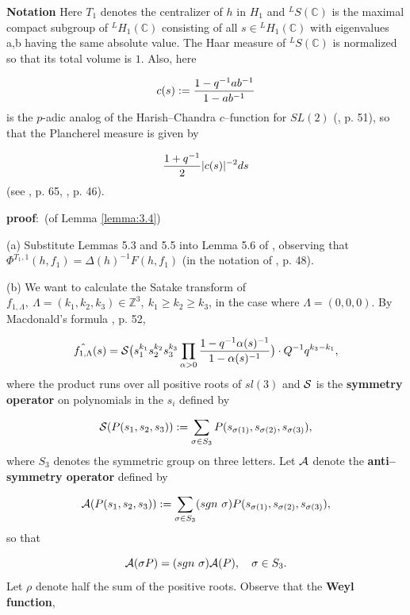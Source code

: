 \documentclass[12pt,letterpaper]{article}
\def\sss{{\cal S}}
\def\ccc{\mathbb{C}}
\def\zzz{\mathbb{Z}}
\def\pf{{\bf proof}:\ }
\begin{document}
{\bf Notation}
Here $T_1$ denotes the centralizer of $h$ in $H_1$ and
$^{L}S(\ccc )$ is the maximal compact subgroup of $^{L}H_1(\ccc )$
consisting of all $s\in {^{L}H_1}(\ccc )$ with eigenvalues a,b having the
same absolute value. The Haar measure of $^{L}S(\ccc )$ is normalized so 
that its total volume is $1$. Also, here

\[
c(s) := {1-q^{-1}ab^{-1}\over{1-ab^{-1}}}
\]
is the $p$-adic analog of the Harish--Chandra $c$--function for $SL(2)$
(\cite{M}, p. 51), so that the Plancherel measure is given by

\[
{1+q^{-1}\over{2}}|c(s)|^{-2}ds
\]
(see \cite{M}, p. 65, \cite{La3}, p. 46).

\pf (of Lemma \ref{lemma:3.4})

(a) Substitute Lemmas 5.3 and 5.5 into Lemma 5.6 of \cite{La3},
observing that $\Phi^{T_1,1}(h,f_1)=\Delta (h)^{-1}F(h,f_1)$
(in the notation of \cite{La3}, p. 48).

(b) We want to calculate the Satake transform of ${f_{1,\Lambda}},
\ \Lambda =(k_1,k_2,k_3)\in\zzz^3, \ k_1\geq k_2\geq k_3$, in the
case where $\Lambda =(0,0,0)$. By Macdonald's formula 
\cite{M}, p. 52,

\begin{equation}
\label{eqn:3.5}
\hat{f_{1,\Lambda}}(s)
=\sss \big(s_1^{k_1}s_2^{k_2}s_3^{k_3}\prod_{\alpha >0}
{1-q^{-1}\alpha (s)^{-1}\over{1-\alpha (s)^{-1}}}\big)
\cdot Q^{-1}q^{k_3-k_1},
\end{equation}
where the product runs over all positive roots of $sl(3)$ and
$\sss$ is the {\bf symmetry operator} on polynomials in the 
$s_i$ defined by

\begin{equation}
\label{eqn:3.6}
\sss (P(s_1,s_2,s_3)) := \sum_{\sigma\in S_3}
P(s_{\sigma (1)},s_{\sigma (2)},s_{\sigma (3)}),
\end{equation}
where $S_3$ denotes the symmetric group on three letters. Let
${\cal A}$ denote the {\bf anti--symmetry operator} defined by

\begin{equation}
\label{eqn:3.7}
{\cal A} (P(s_1,s_2,s_3)) := \sum_{\sigma\in S_3}
(sgn\  \sigma )P(s_{\sigma (1)},s_{\sigma (2)},s_{\sigma (3)}),
\end{equation}
so that

\begin{equation}
\label{eqn:3.8}
{\cal A} (\sigma P) = (sgn\ \sigma ){\cal A} (P),\ \ \ \sigma\in S_3.
\end{equation}
Let $\rho$ denote half the sum of the positive roots.
Observe that the {\bf Weyl function},
\end{document}
